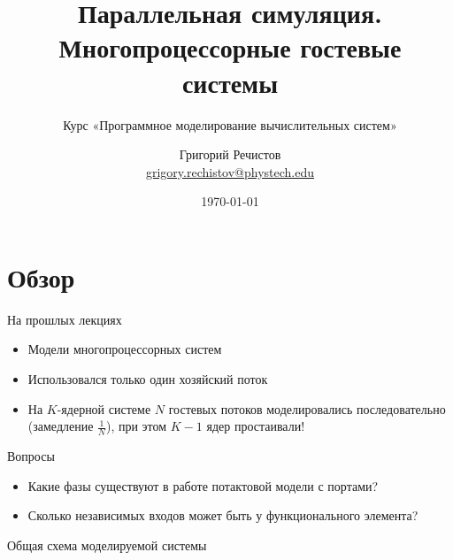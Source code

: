 \documentclass{beamer}
\title{Параллельная симуляция. Многопроцессорные гостевые системы}
\subtitle{Курс «Программное моделирование вычислительных систем»}
\author[]{Григорий Речистов \\ \small{\href{mailto:grigory.rechistov@phystech.edu}{grigory.rechistov@phystech.edu}}}
\date{\today}
\begin{document}
\begin{frame}
\titlepage
\end{frame}

\begin{frame}
\tableofcontents
\end{frame} 

\section{Обзор}

\begin{frame}{На прошлых лекциях}
\begin{itemize}
    \item Модели многопроцессорных систем
    \item Использовался только один хозяйский поток
    \item На $K$-ядерной системе $N$ гостевых потоков моделировались последовательно (замедление $\frac{1}{N}$), при этом $K-1$ ядер простаивали!
\end{itemize}
\end{frame}

\begin{frame}{Вопросы}
\begin{itemize}
\item Какие фазы существуют в работе потактовой модели с портами?\pause
\item Сколько независимых входов может быть у функционального элемента? %
\end{itemize}
\end{frame}

\begin{frame}{Общая схема моделируемой системы}

\centering


    
\end{frame}

\end{document}
